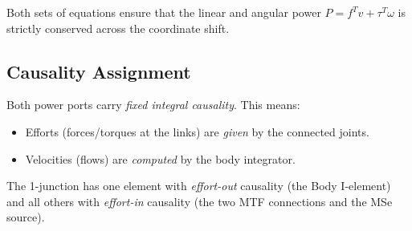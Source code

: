 Both sets of equations ensure that the linear and angular power $P = f^T v + \tau^T \omega$ is strictly conserved across the coordinate shift.

\subsection{Causality Assignment}

Both power ports carry \emph{fixed integral causality}.
This means:
\begin{itemize}
  \item Efforts (forces/torques at the links) are \emph{given} by the connected joints.
  \item Velocities (flows) are \emph{computed} by the body integrator.
\end{itemize}
The 1-junction has one element with \emph{effort-out} causality (the Body I-element) and all others with \emph{effort-in} causality (the two MTF connections and the MSe source).

